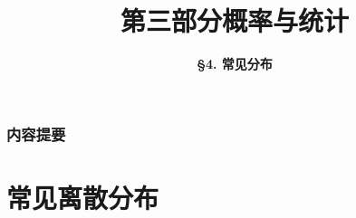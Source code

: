 



\title[Probability \& Statistics]{\LARGE \bfseries 第三部分\quad 概率与统计} %
\author[Common Distributions] %
{\Large \bfseries \S 4. 常见分布}
\date{}






\begin{frame}

\titlepage %

\end{frame}


\begin{frame}
\frametitle{内容提要} %
\tableofcontents %
\end{frame}


\section{常见离散分布}


